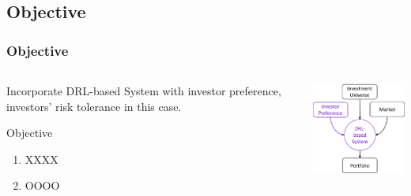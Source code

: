 \subsection{Objective}
\begin{frame}
\frametitle{Objective}
\begin{columns}
\begin{column}{0.55\textwidth}
Incorporate DRL-based System with investor preference, \alert{investors' risk tolerance} in this case.


\begin{block}{Objective}
\begin{enumerate}
    \item XXXX
    \item OOOO
\end{enumerate}
\end{block}


\end{column}
\begin{column}{0.45\textwidth}
\begin{center}
\includegraphics[width=4.8cm]{images/rl2.png}
\end{center}
\end{column}
\end{columns}
\end{frame}




